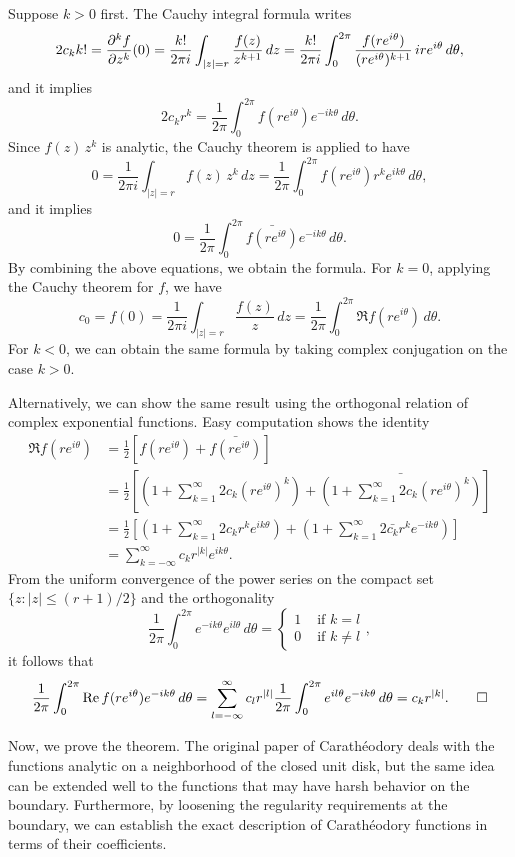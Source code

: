 \documentclass[a4paper]{article}
\begin{document}
\begin{pf}
Suppose $k>0$ first.
The Cauchy integral formula writes
\begin{align*}
2c_kk!=\pd[k]{f}{z}(0)=\frac{k!}{2\pi i}\int_{|z|=r}\frac{f(z)}{z^{k+1}}\,dz=\frac{k!}{2\pi i}\int_0^{2\pi}\frac{f(re^{i\theta})}{(re^{i\theta})^{k+1}}\,ire^{i\theta}\,d\theta,
\end{align*}
and it implies
\[2c_kr^k=\frac1{2\pi}\int_0^{2\pi}f(re^{i\theta})e^{-ik\theta}\,d\theta.\]
Since $f(z)\,z^k$ is analytic, the Cauchy theorem is applied to have
\[0=\frac1{2\pi i}\int_{|z|=r}f(z)\,z^k\,dz=\frac1{2\pi}\int_0^{2\pi}f(re^{i\theta})r^ke^{ik\theta}\,d\theta,\]
and it implies
\[0=\frac1{2\pi}\int_0^{2\pi}\bar{f(re^{i\theta})}e^{-ik\theta}\,d\theta.\]
By combining the above equations, we obtain the formula.
For $k=0$, applying the Cauchy theorem for $f$, we have
\[c_0=f(0)=\frac1{2\pi i}\int_{|z|=r}\frac{f(z)}z\,dz=\frac1{2\pi}\int_0^{2\pi}\Re f(re^{i\theta})\,d\theta.\]
For $k<0$, we can obtain the same formula by taking complex conjugation on the case $k>0$.

Alternatively, we can show the same result using the orthogonal relation of complex exponential functions.
Easy computation shows the identity
\begin{align*}
\Re f(re^{i\theta})
&=\frac12[f(re^{i\theta})+\bar{f(re^{i\theta})}]\\
&=\frac12\left[\left(1+\sum_{k=1}^\infty2c_k(re^{i\theta})^k\right)+\bar{\left(1+\sum_{k=1}^\infty2c_k(re^{i\theta})^k\right)}\right]\\
&=\frac12\left[\left(1+\sum_{k=1}^\infty2c_kr^ke^{ik\theta}\right)+\left(1+\sum_{k=1}^\infty2\bar{c_k}r^ke^{-ik\theta}\right)\right]\\
&=\sum_{k=-\infty}^\infty c_kr^{|k|}e^{ik\theta}.
\end{align*}
From the uniform convergence of the power series on the compact set $\{z:|z|\le(r+1)/2\}$ and the orthogonality
\[\frac1{2\pi}\int_0^{2\pi}e^{-ik\theta}e^{il\theta}\,d\theta=\begin{cases}1&\text{ if }k=l\\0&\text{ if }k\ne l\end{cases},\]
it follows that
\[\frac1{2\pi}\int_0^{2\pi}\Re f(re^{i\theta})e^{-ik\theta}\,d\theta=\sum_{l=-\infty}^{\infty}c_lr^{|l|}\frac1{2\pi}\int_0^{2\pi}e^{il\theta}e^{-ik\theta}\,d\theta=c_kr^{|k|}.\qedhere\]
\end{pf}

Now, we prove the theorem.
The original paper of Carath\'eodory deals with the functions analytic on a neighborhood of the closed unit disk, but the same idea can be extended well to the functions that may have harsh behavior on the boundary.
Furthermore, by loosening the regularity requirements at the boundary, we can establish the exact description of Carath\'eodory functions in terms of their coefficients.
\end{document}
